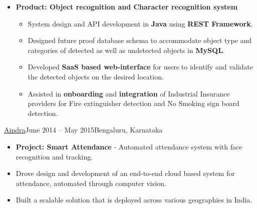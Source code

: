 \documentclass[10pt,a4paper,ragged2e,withhyper]{altacv}
\begin{document}
\begin{paracol}{2}
\begin{itemize}
\begin{itemize}
\end{itemize}


\item[\textbf{2.}] \textbf{Product: Object recognition and Character recognition system}
\begin{itemize}
\item System design and API development in \textbf{Java} using \textbf{REST Framework}.
\item Designed future proof database schema to accommodate object type and categories of detected as well as undetected objects in \textbf{MySQL}.
\item Developed \textbf{SaaS based web-interface} for users to identify and validate the detected objects on the desired location.
\item Assisted in \textbf{onboarding} and \textbf{integration} of Industrial Insurance providers for Fire extinguisher detection and No Smoking sign board detection.
\end{itemize}

\end{itemize}


\divider

{\href{https://www.aindra.in/}{Aindra}}{June 2014 – May 2015}{Bengaluru, Karnataka}
\begin{itemize}
\item \textbf{Project: Smart Attendance} - Automated attendance system with face recognition and tracking.
\item Drove design and development of an end-to-end cloud based system for attendance, automated through computer vision.
\item Built a scalable solution that is deployed across various geographies in India.


\end{itemize}
\end{paracol}
\end{document}
